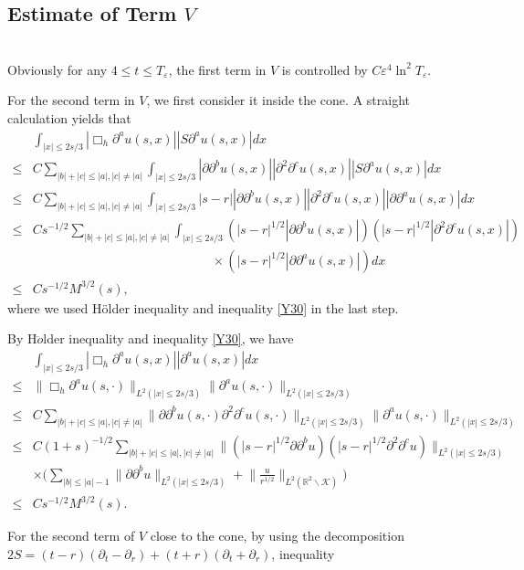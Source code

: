 \documentclass[11pt, reqno]{amsart}
\theoremstyle{definition}
\theoremstyle{remark}
\theoremstyle{definition}
\numberwithin{equation}{section}
\numberwithin{equation}{section}
\def\leq{\leqslant}
\begin{document}
\subsection{Estimate of Term $V$}
~\\
Obviously for any $4\leq t\leq T_{\varepsilon}$, the first term in
$V$ is controlled by $C\varepsilon^4\ln^2 T_{\varepsilon}$.
\par For the second term in $V$, we first consider it inside the cone. A straight calculation yields that
\begin{align*}
&\int_{|x|\leq2s/3}|\Box_h\partial^au(s,x)||S\partial^au(s,x)|dx
\\\leq& C\sum_{|b|+|c|\leq |a|,|c|\neq |a|}\int_{|x|\leq2s/3}|\partial\partial^bu(s,x)||\partial^2\partial^cu(s,x)||S\partial^au(s,x)|dx
\\\leq& C\sum_{|b|+|c|\leq |a|,|c|\neq |a|}\int_{|x|\leq2s/3}|s-r||\partial\partial^bu(s,x)||\partial^2\partial^cu(s,x)||\partial\partial^au(s,x)|dx
\\\leq& Cs^{-1/2}\sum_{|b|+|c|\leq |a|,|c|\neq |a|}\int_{|x|\leq2s/3}(|s-r|^{1/2}|\partial\partial^bu(s,x)|)(|s-r|^{1/2}|\partial^2\partial^cu(s,x)|)
\\&\qquad\qquad\qquad\qquad\qquad\qquad\qquad\times(|s-r|^{1/2}|\partial\partial^au(s,x)|)dx
\\\leq& Cs^{-1/2}M^{3/2}(s),
\end{align*}
where we used H\"{o}lder inequality and inequality \eqref{Y30} in the last step.
\par
By H$\ddot{o}$lder inequality and inequality \eqref{Y30}, we have
\begin{align*}
&\int_{|x|\leq2s/3}|\Box_h\partial^au(s,x)||\partial^au(s,x)|dx\\\leq&
\|\Box_h\partial^au(s,\cdot)\|_{L^2(|x|\leq2s/3)}\|\partial^au(s,\cdot)\|_{L^2(|x|\leq2s/3)}
\\\leq& C\sum_{|b|+|c|\leq 
|a|,|c|\neq|a|}\|\partial\partial^bu(s,\cdot)\partial^2\partial^cu(s,\cdot)\|_{L^2(|x|\leq2s/3)}\|\partial^au(s,\cdot)\|_{L^2(|x|\leq2s/3)}
\\\leq& C(1+s)^{-1/2}\sum_{|b|+|c|\leq |a|,|c|\neq|a|}\|(|s-r|^{1/2}\partial\partial^bu)(|s-r|^{1/2}\partial^2\partial^cu)\|_{L^2(|x|\leq2s/3)}
\\&\times\Big(\sum_{|b|\leq |a|-1}\|\partial\partial^bu\|_{L^2(|x|\leq2s/3)}+\Big\|\frac u {r^{1/2}}\Big\|_{L^2(\mathbb R^2\backslash\mathcal{K})}\Big)
\\\leq& Cs^{-1/2}M^{3/2}(s).
\end{align*}
\par For the second term of $V$ close to the cone, by using the decomposition $2S=(t-r)(\partial_t-\partial_r)+(t+r)(\partial_t+\partial_r)$, inequality 
\end{document}

